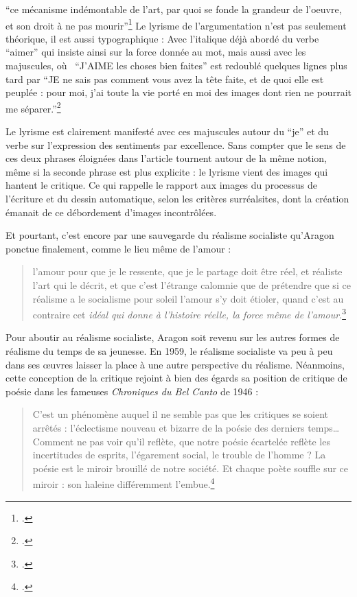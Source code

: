 \enquote{ce mécanisme indémontable de l’art, par quoi se fonde la grandeur de l’oeuvre, et son droit à ne pas mourir}\footcite{savoiraimer} Le lyrisme de l’argumentation n’est pas seulement théorique, il est aussi typographique : Avec l’italique déjà abordé du verbe \enquote{aimer} qui insiste ainsi sur la force donnée au mot, mais aussi avec les majuscules, où  \enquote{J’AIME les choses bien faites} est redoublé quelques lignes plus tard par \enquote{JE ne sais pas comment vous avez la tête faite, et de quoi elle est peuplée : pour moi, j’ai toute la vie porté en moi des images dont rien ne pourrait me séparer.}\footcite{savoiraimer}

Le lyrisme est clairement manifesté avec ces majuscules autour du \enquote{je} et du verbe sur l’expression des sentiments par excellence. Sans compter que le sens de ces deux phrases éloignées dans l’article tournent autour de la même notion, même si la seconde phrase est plus explicite : le lyrisme vient des images qui hantent le critique. Ce qui rappelle le rapport aux images du processus de l'écriture et du dessin automatique, selon les critères surréalsites, dont la création émanait de ce débordement d'images incontrôlées. 

	Et pourtant, c’est encore par une sauvegarde du réalisme socialiste qu’Aragon ponctue finalement, comme le lieu même de l’amour : 
\begin{quote}
  l’amour pour que je le ressente, que je le partage doit  être réel, et réaliste l’art qui le décrit, et que c’est l’étrange calomnie que de prétendre que si ce réalisme a le socialisme pour soleil l’amour s’y doit étioler, quand c’est au contraire cet \emph{idéal qui donne à l’histoire réelle, la force même de l’amour}.\footcite{savoiraimer}\end{quote}


Pour aboutir au réalisme socialiste, Aragon soit revenu sur les autres formes de réalisme du temps de sa jeunesse. En 1959, le réalisme socialiste va peu à peu dans ses \oe{}uvres laisser la place à une autre perspective du réalisme. Néanmoins, cette conception de la critique rejoint à bien des égards sa position de critique de poésie dans les fameuses \emph{Chroniques du Bel Canto} de 1946 : 

\begin{quote}C’est un phénomène auquel il ne semble pas que les critiques se soient arrêtés : l’éclectisme nouveau et bizarre de la poésie des derniers temps…Comment ne pas voir qu’il reflète, que notre poésie écartelée reflète les incertitudes de esprits, l’égarement social, le trouble de l’homme ? La poésie est le miroir brouillé de notre société. Et chaque poète souffle sur ce miroir : son haleine différemment l’embue.\footcite[p93]{belcanto}\end{quote}

